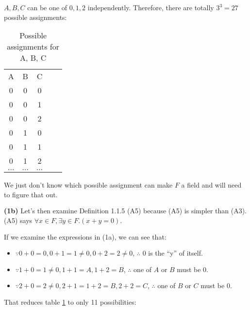 \documentclass[12pt, letterpaper, oneside]{book}
\begin{document}
$A, B, C$ can be one of $0, 1, 2$ independently. Therefore, there are totally $3^3 = 27$ possible assignments:

\begin{table}[H]
  \centering
  \begin{tabular}{|c|c|c|ll}
    \cline{1-3}
    A        & B        & C        &  & \\ [1ex] \cline{1-3}
    0        & 0        & 0        &  & \\ [0.5ex] \cline{1-3}
    0        & 0        & 1        &  & \\ [0.5ex] \cline{1-3}
    0        & 0        & 2        &  & \\ [0.5ex] \cline{1-3}
    0        & 1        & 0        &  & \\ [0.5ex] \cline{1-3}
    0        & 1        & 1        &  & \\ [0.5ex] \cline{1-3}
    0        & 1        & 2        &  & \\ [0.5ex] \cline{1-3}
    $\ldots$ & $\ldots$ & $\ldots$ &  & \\ [0.5ex] \cline{1-3}
  \end{tabular}
  \caption{Possible assignments for A, B, C}
  \label{table:1.1.8-1a}
\end{table}

We just don't know which possible assignment can make $F$ a field and will need to figure that out.

\textbf{(1b)} Let's then examine Definition 1.1.5 (A5) because (A5) is simpler than (A3). (A5) says $\forall x \in F,
  \exists y \in F. (x + y = 0)$.

If we examine the expressions in (1a), we can see that:
\begin{itemize}
  \item $\because 0 + 0 = 0, 0 + 1 = 1 \ne 0, 0 + 2 = 2 \ne 0$, $\therefore$ $0$ is the ``y'' of itself.
  \item $\because 1 + 0 = 1 \ne 0, 1 + 1 = A, 1 + 2 = B$, $\therefore$ one of $A$ or $B$ must be $0$.
  \item $\because 2 + 0 = 2 \ne 0, 2 + 1 = 1 + 2 = B, 2 + 2 = C$, $\therefore$ one of $B$ or $C$ must be $0$.
\end{itemize}

That reduces table \ref{table:1.1.8-1a} to only 11 possibilities:
\end{document}
